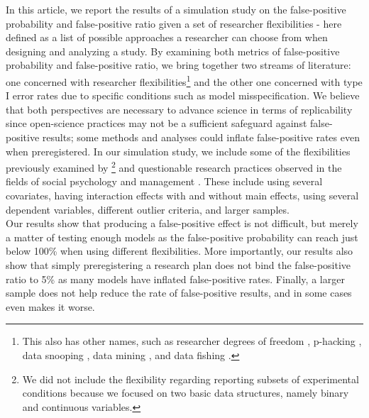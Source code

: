In this article, we report the results of a simulation study on the false-positive probability and false-positive ratio given a set of researcher flexibilities - here defined as a list of possible approaches a researcher can choose from when designing and analyzing a study. By examining both metrics of false-positive probability and false-positive ratio, we bring together two streams of literature: one concerned with researcher flexibilities\footnote{This also has other names, such as researcher degrees of freedom \citep{Simmons2011}, p-hacking \citep{simonsohn2014p}, data snooping \citep{white2000reality}, data mining \citep{lovell1983}, and data fishing \citep{selvin1966data}.} and the other one concerned with type I error rates due to specific conditions such as model misspecification. We believe that both perspectives are necessary to advance science in terms of replicability since open-science practices may not be a sufficient safeguard against false-positive results; some methods and analyses could inflate false-positive rates even when preregistered. In our simulation study, we include some of the flexibilities previously examined by \cite{Simmons2011}\footnote{We did not include the flexibility regarding reporting subsets of experimental conditions because we focused on two basic data structures, namely binary and continuous variables.} and questionable research practices observed in the fields of social psychology \citep{Cairo2020} and management \citep{OBoyle2017}. These include using several covariates, having interaction effects with and without main effects, using several dependent variables, different outlier criteria, and larger samples. \\ 
Our results show that producing a false-positive effect is not difficult, but merely a matter of testing enough models as the false-positive probability can reach just below 100\% when using different flexibilities. More importantly, our results also show that simply preregistering a research plan does not bind the false-positive ratio to 5\% as many models have inflated false-positive rates. Finally, a larger sample does not help reduce the rate of false-positive results, and in some cases even makes it worse. 
